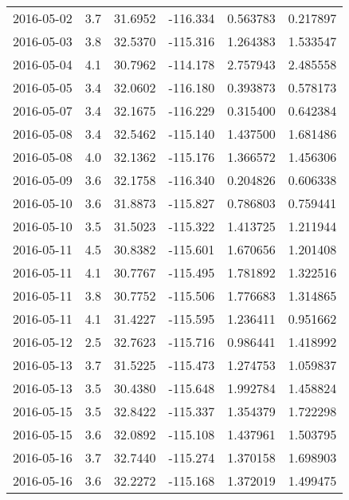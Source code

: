 \begin{tabular}{lrrrrr}
2016-05-02 &       3.7 &  31.6952 &  -116.334 &         0.563783 &         0.217897 \\
2016-05-03 &       3.8 &  32.5370 &  -115.316 &         1.264383 &         1.533547 \\
2016-05-04 &       4.1 &  30.7962 &  -114.178 &         2.757943 &         2.485558 \\
2016-05-05 &       3.4 &  32.0602 &  -116.180 &         0.393873 &         0.578173 \\
2016-05-07 &       3.4 &  32.1675 &  -116.229 &         0.315400 &         0.642384 \\
2016-05-08 &       3.4 &  32.5462 &  -115.140 &         1.437500 &         1.681486 \\
2016-05-08 &       4.0 &  32.1362 &  -115.176 &         1.366572 &         1.456306 \\
2016-05-09 &       3.6 &  32.1758 &  -116.340 &         0.204826 &         0.606338 \\
2016-05-10 &       3.6 &  31.8873 &  -115.827 &         0.786803 &         0.759441 \\
2016-05-10 &       3.5 &  31.5023 &  -115.322 &         1.413725 &         1.211944 \\
2016-05-11 &       4.5 &  30.8382 &  -115.601 &         1.670656 &         1.201408 \\
2016-05-11 &       4.1 &  30.7767 &  -115.495 &         1.781892 &         1.322516 \\
2016-05-11 &       3.8 &  30.7752 &  -115.506 &         1.776683 &         1.314865 \\
2016-05-11 &       4.1 &  31.4227 &  -115.595 &         1.236411 &         0.951662 \\
2016-05-12 &       2.5 &  32.7623 &  -115.716 &         0.986441 &         1.418992 \\
2016-05-13 &       3.7 &  31.5225 &  -115.473 &         1.274753 &         1.059837 \\
2016-05-13 &       3.5 &  30.4380 &  -115.648 &         1.992784 &         1.458824 \\
2016-05-15 &       3.5 &  32.8422 &  -115.337 &         1.354379 &         1.722298 \\
2016-05-15 &       3.6 &  32.0892 &  -115.108 &         1.437961 &         1.503795 \\
2016-05-16 &       3.7 &  32.7440 &  -115.274 &         1.370158 &         1.698903 \\
2016-05-16 &       3.6 &  32.2272 &  -115.168 &         1.372019 &         1.499475 \\

\end{tabular}
